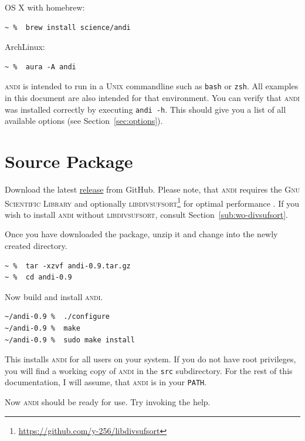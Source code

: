 \documentclass[a4paper,
  10pt,
  english,
  DIV=12,
  BCOR=8mm]{scrbook}
\newcommand{\algo}[1]{\textsc{{#1}}}
\newcommand{\andi}{\algo{andi}\xspace}
\begin{document}
\noindent OS X with homebrew:

\begin{lstlisting}
~ %  brew install science/andi
\end{lstlisting}

\noindent ArchLinux:

\begin{lstlisting}
~ %  aura -A andi
\end{lstlisting}

\andi is intended to run in a \algo{Unix} commandline such as \lstinline$bash$ or \lstinline$zsh$. All examples in this document are also intended for that environment. You can verify that \andi was installed correctly by executing \lstinline$andi -h$. This should give you a list of all available options (see Section~\ref{sec:options}).

\section{Source Package} \label{sub:regular}

Download the latest \href{https://github.com/EvolBioInf/andi/releases}{release} from GitHub. Please note, that \andi requires the \algo{Gnu Scientific Library} and optionally \algo{libdivsufsort}\footnote{\url{https://github.com/y-256/libdivsufsort}} for optimal performance \cite{divsufsort}. If you wish to install \andi without \algo{libdivsufsort}, consult Section~\ref{sub:wo-divsufsort}.

Once you have downloaded the package, unzip it and change into the newly created directory. 

\begin{lstlisting}
~ %  tar -xzvf andi-0.9.tar.gz
~ %  cd andi-0.9
\end{lstlisting}

\noindent Now build and install \andi.

\begin{lstlisting}
~/andi-0.9 %  ./configure
~/andi-0.9 %  make
~/andi-0.9 %  sudo make install
\end{lstlisting}

\noindent This installs \andi for all users on your system. If you do not have root privileges, you will find a working copy of \andi in the \lstinline$src$ subdirectory. For the rest of this documentation, I will assume, that \andi is in your \textdollar\lstinline!PATH!.

Now \andi should be ready for use. Try invoking the help.
\end{document}
